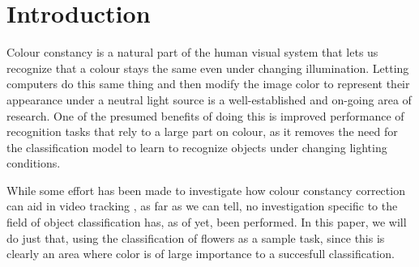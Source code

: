 \section{Introduction}

Colour constancy is a natural part of the human visual system that lets us recognize that a colour
stays the same even under changing illumination. Letting computers do this same thing and then 
modify the image color to represent their appearance under a neutral light source is a well-established
and on-going area of research. One of the presumed benefits of doing this is improved performance 
of recognition tasks that rely to a large part on colour, as it removes the need for the classification
model to learn to recognize objects under changing lighting conditions.

While some effort has been made to investigate how colour constancy correction can aid in video tracking
\cite{Agarwal2006}, as far as we can tell, no investigation specific to the field of object
classification has, as of yet, been performed. In this paper, we will do just that, using the
classification of flowers as a sample task, since this is clearly an area where color is of large
importance to a succesfull classification.